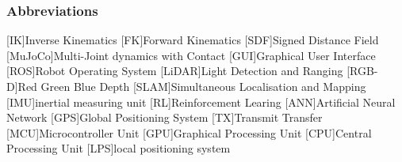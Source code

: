 \begin{Nomencl}[2.75cm]
\end{Nomencl}

\subsubsection*{Abbreviations}
    \hfill\begin{minipage}{\dimexpr\textwidth-\NomLblSep}
        \begin{acronym}[MMMMMMii]
            [IK]{Inverse Kinematics}
            [FK]{Forward Kinematics}
            [SDF]{Signed Distance Field}
            [MuJoCo]{Multi-Joint dynamics with Contact}
            [GUI]{Graphical User Interface}
            [ROS]{Robot Operating System}
            [LiDAR]{Light Detection and Ranging}
            [RGB-D]{Red Green Blue Depth}
            [SLAM]{Simultaneous Localisation and Mapping}
            [IMU]{inertial measuring unit}
            [RL]{Reinforcement Learing}
            [ANN]{Artificial Neural Network}
            [GPS]{Global Positioning System}
            [TX]{Transmit Transfer} 
            [MCU]{Microcontroller Unit}
            [GPU]{Graphical Processing Unit}
            [CPU]{Central Processing Unit}
            [LPS]{local positioning system}
        \end{acronym}       
    \end{minipage}

